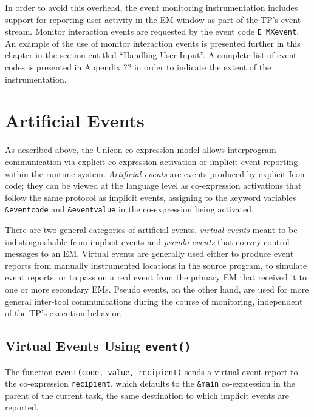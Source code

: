 In order to avoid this overhead, the event monitoring instrumentation
includes support for reporting user activity in the EM window as part
of the TP's event stream.
Monitor interaction events are requested by
the event code {\tt E\_MXevent}.  An example of the use of monitor
interaction events is presented further in this chapter in the section
entitled ``Handling User Input''.  A complete list of event codes
is presented in Appendix ?? in order to indicate the extent of the
instrumentation.


\section{Artificial Events}

As described above, the Unicon co-expression model allows
interprogram communication via explicit co-expression activation or
implicit event reporting within the runtime system.
{\em Artificial events\/} are events produced by explicit 
Icon code; they can be viewed at the language level as co-expression
activations that follow the same protocol as implicit events,
assigning to the keyword variables {\tt \&eventcode} and
{\tt \&eventvalue} in the co-expression being activated.

There are two general categories of artificial events, {\em virtual events\/}
meant to be indistinguishable from implicit events and {\em pseudo events\/}
that convey control messages to an EM.  Virtual events are generally
used either to produce event reports from manually instrumented
locations in the source program, to simulate event reports, or to pass
on a real event from the primary EM that received it to one or
more secondary EMs.  Pseudo events, on the other hand, are used for
more general inter-tool communications during the course of monitoring,
independent of the TP's execution behavior.

\subsection*{Virtual Events Using {\tt event()}}

The function {\tt event(code, value, recipient)} sends
a virtual event report to the co-expression {\tt recipient}, which
defaults to the {\tt \&main} co-expression in the parent of the
current task, the same destination to which implicit events are
reported.

